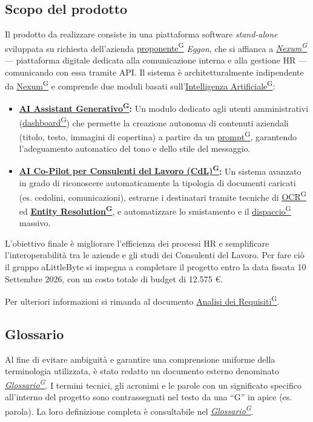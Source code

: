 \documentclass[a4paper,12pt]{article}
\providecommand{\glslink}[2]{\href{https://alittlebyte-19.github.io/Documentazione/glossario.html\#gls-#1}{\underline{#2}\textsuperscript{\scriptsize G}}}
\begin{document}
\subsection{Scopo del prodotto}
Il prodotto da realizzare consiste in una piattaforma software \textit{stand-alone} sviluppata su richiesta dell'azienda \glslink{committente-proponente}{proponente} \textit{Eggon}, che si affianca a \textit{\glslink{nexum}{Nexum}} — piattaforma digitale dedicata alla comunicazione interna e alla gestione HR — comunicando con essa tramite API. Il sistema è architetturalmente indipendente da \glslink{nexum}{Nexum} e comprende due moduli basati sull'\glslink{intelligenza-artificiale-ai}{Intelligenza Artificiale}:
\begin{itemize}
    \item \textbf{\glslink{ai-assistant-generativo}{AI Assistant Generativo}:} Un modulo dedicato agli utenti amministrativi (\glslink{dashboard}{dashboard}) che permette la creazione autonoma di contenuti aziendali (titolo, testo, immagini di copertina) a partire da un \glslink{prompt}{prompt}, garantendo l'adeguamento automatico del tono e dello stile del messaggio.
    \item \textbf{\glslink{ai-co-pilot-per-consulenti-del-lavoro-cdl}{AI Co-Pilot per Consulenti del Lavoro (CdL)}:} Un sistema avanzato in grado di riconoscere automaticamente la tipologia di documenti caricati (es. cedolini, comunicazioni), estrarne i destinatari tramite tecniche di \glslink{ocr-riconoscimento-ottico-dei-caratteri}{OCR} ed \textbf{\glslink{entity-resolution}{Entity Resolution}}, e automatizzare lo smistamento e il \glslink{dispaccio}{dispaccio} massivo.
\end{itemize}

L'obiettivo finale è migliorare l'efficienza dei processi HR e semplificare l'interoperabilità tra le aziende e gli studi dei Consulenti del Lavoro. Per fare ciò il gruppo aLittleByte si impegna a completare il progetto entro la data fissata 10 Settembre 2026, con un costo totale di budget di 12.575 €. 

Per ulteriori informazioni si rimanda al documento \glslink{analisi-dei-requisiti-adr}{Analisi dei Requisiti}. 


\subsection{Glossario}

Al fine di evitare ambiguità e garantire una comprensione uniforme della terminologia utilizzata, è stato redatto un documento esterno denominato \textit{\glslink{glossario}{Glossario}}.
I termini tecnici, gli acronimi e le parole con un significato specifico all'interno del progetto sono contrassegnati nel testo da una ``G'' in apice (es. parola\textsuperscript{}). La loro definizione completa è consultabile nel \textit{\glslink{glossario}{Glossario}}.
\newpage
\end{document}
